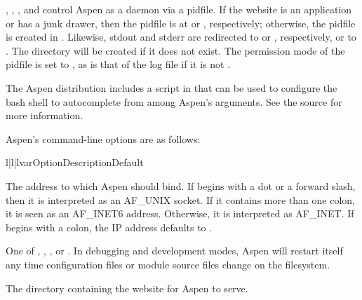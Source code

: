 , , , and  control Aspen as a
daemon via a pidfile. If the website is an application or has a junk drawer,
then the pidfile is at  or ,
respectively; otherwise, the pidfile is created in . Likewise, stdout
and stderr are redirected to  or ,
respectively, or to . The  directory will be created
if it does not exist. The permission mode of the pidfile is set to ,
as is that of the log file if it is not .

The Aspen distribution includes a script in 
that can be used to configure the bash shell to autocomplete from among Aspen's
arguments. See the source for more information.

Aspen's command-line options are as follows:

\begin{tableiii}{l|l|l}{var}{Option}{Description}{Default}

    {The address to which Aspen should bind. If  begins with a dot
    or a forward slash, then it is interpreted as an AF_UNIX socket. If it
    contains more than one colon, it is seen as an AF_INET6 address. Otherwise,
    it is interpreted as AF_INET. If  begins with a colon, the IP
    address defaults to .} {}


    {One of , , , or
    . In debugging and development modes, Aspen will restart
    itself any time configuration files or module source files change on the
    filesystem.}
    {}

    {The directory containing the website for Aspen to serve.}
    {}


\end{tableiii}

